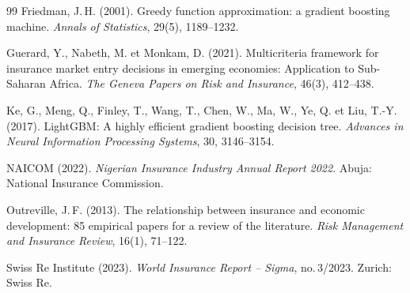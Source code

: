 \documentclass[../main.tex]{subfiles}
\begin{document}
\begin{thebibliography}{99}
Friedman, J.\,H. (2001).
\newblock Greedy function approximation: a gradient boosting machine.
\newblock \emph{Annals of Statistics}, 29(5), 1189--1232.

Guerard, Y., Nabeth, M. et Monkam, D. (2021).
\newblock Multicriteria framework for insurance market entry decisions in emerging
  economies: Application to Sub-Saharan Africa.
\newblock \emph{The Geneva Papers on Risk and Insurance}, 46(3), 412--438.

Ke, G., Meng, Q., Finley, T., Wang, T., Chen, W., Ma, W., Ye, Q. et Liu, T.-Y. (2017).
\newblock LightGBM: A highly efficient gradient boosting decision tree.
\newblock \emph{Advances in Neural Information Processing Systems}, 30, 3146--3154.

NAICOM (2022).
\newblock \emph{Nigerian Insurance Industry Annual Report 2022}.
\newblock Abuja: National Insurance Commission.

Outreville, J.\,F. (2013).
\newblock The relationship between insurance and economic development:
  85 empirical papers for a review of the literature.
\newblock \emph{Risk Management and Insurance Review}, 16(1), 71--122.

Swiss Re Institute (2023).
\newblock \emph{World Insurance Report -- Sigma}, no.\,3/2023.
\newblock Zurich: Swiss Re.

\end{thebibliography}

\clearpage

\appendix
\end{document}
